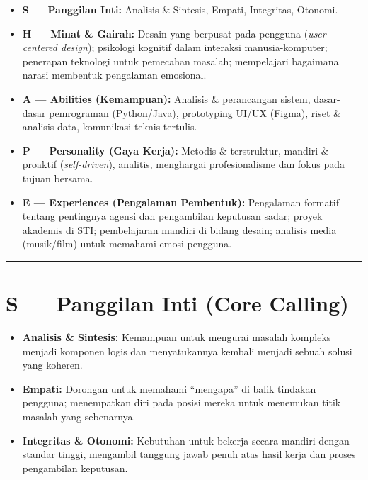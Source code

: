 \documentclass[
  letterpaper,
  DIV=11,
  numbers=noendperiod]{scrreprt}
\providecommand{\tightlist}{%
  \setlength{\itemsep}{0pt}\setlength{\parskip}{0pt}}
\begin{document}
\begin{itemize}
\tightlist
\item
  \textbf{S --- Panggilan Inti:} Analisis \& Sintesis, Empati,
  Integritas, Otonomi.
\item
  \textbf{H --- Minat \& Gairah:} Desain yang berpusat pada pengguna
  (\emph{user-centered design}); psikologi kognitif dalam interaksi
  manusia-komputer; penerapan teknologi untuk pemecahan masalah;
  mempelajari bagaimana narasi membentuk pengalaman emosional.
\item
  \textbf{A --- Abilities (Kemampuan):} Analisis \& perancangan sistem,
  dasar-dasar pemrograman (Python/Java), prototyping UI/UX (Figma),
  riset \& analisis data, komunikasi teknis tertulis.
\item
  \textbf{P --- Personality (Gaya Kerja):} Metodis \& terstruktur,
  mandiri \& proaktif (\emph{self-driven}), analitis, menghargai
  profesionalisme dan fokus pada tujuan bersama.
\item
  \textbf{E --- Experiences (Pengalaman Pembentuk):} Pengalaman formatif
  tentang pentingnya agensi dan pengambilan keputusan sadar; proyek
  akademis di STI; pembelajaran mandiri di bidang desain; analisis media
  (musik/film) untuk memahami emosi pengguna.
\end{itemize}

\begin{center}\rule{0.5\linewidth}{0.5pt}\end{center}

\section{S --- Panggilan Inti (Core
Calling)}\label{s-panggilan-inti-core-calling}

\begin{itemize}
\tightlist
\item
  \textbf{Analisis \& Sintesis:} Kemampuan untuk mengurai masalah
  kompleks menjadi komponen logis dan menyatukannya kembali menjadi
  sebuah solusi yang koheren.
\item
  \textbf{Empati:} Dorongan untuk memahami ``mengapa'' di balik tindakan
  pengguna; menempatkan diri pada posisi mereka untuk menemukan titik
  masalah yang sebenarnya.
\item
  \textbf{Integritas \& Otonomi:} Kebutuhan untuk bekerja secara mandiri
  dengan standar tinggi, mengambil tanggung jawab penuh atas hasil kerja
  dan proses pengambilan keputusan.
\end{itemize}
\end{document}
